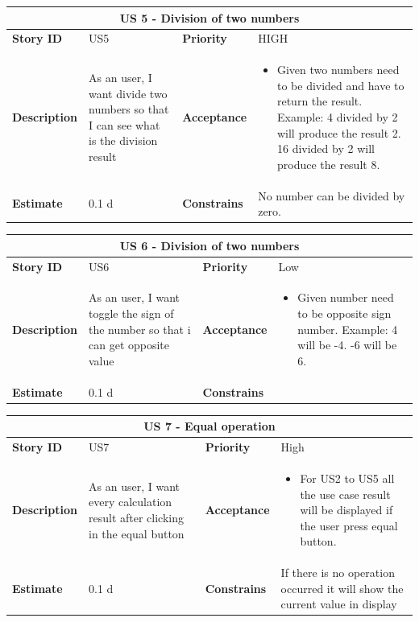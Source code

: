 \documentclass{article}
\begin{document}
\begin{tabular}{ |p{2cm}|p{5cm}|p{2cm}|p{4cm}| }
 \hline
 \multicolumn{4}{|c|}{US 5 - Division of two numbers} \\
 \hline
 \textbf {Story ID}& US5 &  \textbf{Priority} & HIGH \\
 \hline
  \textbf{Description}   & As an user, I want divide two numbers so that I can see what is the division result &    \textbf{Acceptance}& 
\begin{itemize}
\item Given two numbers need to be divided and have to return the result. Example: 4 divided by 2 will produce the result 2. 16 divided by 2 will produce the result 8. 
\end{itemize}
  \\
 \hline
 \textbf{Estimate} & 0.1 d &  \textbf{Constrains}&  No number can be divided by zero. \\
 \hline
\end{tabular}

\begin{tabular}{ |p{2cm}|p{5cm}|p{2cm}|p{4cm}| }
 \hline
 \multicolumn{4}{|c|}{US 6 - Division of two numbers} \\
 \hline
 \textbf {Story ID}& US6 &  \textbf{Priority} & Low \\
 \hline
  \textbf{Description}   & As an user, I want toggle the sign of the number so that i can get opposite value &    \textbf{Acceptance}& 
\begin{itemize}
\item Given number need to be opposite sign number. Example: 4 will be -4.   -6 will be 6. 
\end{itemize}
  \\
 \hline
 \textbf{Estimate} & 0.1 d &  \textbf{Constrains}&   \\
 \hline
\end{tabular}

\begin{tabular}{ |p{2cm}|p{5cm}|p{2cm}|p{4cm}| }
 \hline
 \multicolumn{4}{|c|}{US 7 - Equal operation} \\
 \hline
 \textbf {Story ID}& US7 &  \textbf{Priority} & High \\
 \hline
  \textbf{Description}   & As an user, I want every calculation result after clicking in the equal button &    \textbf{Acceptance}& 
\begin{itemize}
\item For US2 to US5 all the use case result will be displayed if the user press equal button. 
\end{itemize}
  \\
 \hline
 \textbf{Estimate} & 0.1 d &  \textbf{Constrains}& If there is no operation occurred it will show the current value in display   \\
 \hline
\end{tabular}
\end{document}

